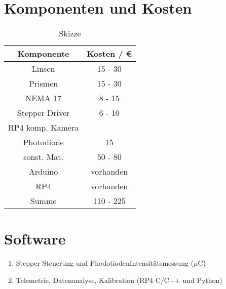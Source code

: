 \section*{Komponenten und Kosten}
\begin{table}[H]
    \centering
    \caption{
        Skizze
    }
    \begin{tabular}{| c | c |}
        \hline
        Komponente &  Kosten / \euro{}\\
        \hline
        Linsen & 15 - 30  \\
        \hline
        Prismen & 15 - 30 \\
        \hline
        NEMA 17 & 8 - 15  \\
        \hline
        Stepper Driver & 6 - 10  \\
        \hline
        RP4 komp. Kamera & \quad 60 \\
        \hline
        Photodiode & 15 \quad  \\
        \hline
        sonst. Mat. & 50 - 80 \\
        \hline
        Arduino & vorhanden \\
        \hline
        RP4 & vorhanden \\
        \hline
        \hline
        Summe & 110 - 225  \\
        \hline
    \end{tabular}
    \label{tab:Komponenten}
\end{table}



\section*{Software}
\begin{enumerate}
    \item Stepper Steuerung und PhodotiodenIntensitätsmessung ($\mu$C)
    \item Telemetrie, Datenanalyse, Kalibration (RP4 C/C++ und Python)
\end{enumerate}

